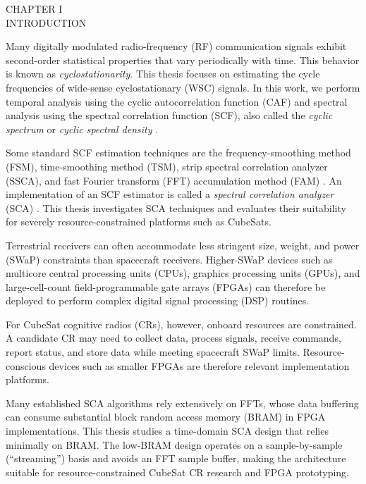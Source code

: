 \newpage
{}

\begin{center}
  \vspace*{1.65in}
  CHAPTER I\\
  INTRODUCTION    
\end{center}
\bigskip

Many digitally modulated radio-frequency (RF) communication signals exhibit second-order statistical properties that vary periodically with time.  This behavior is known as \textit{cyclostationarity}.  This thesis focuses on estimating the cycle frequencies of wide-sense cyclostationary (WSC) signals.  In this work, we perform temporal analysis using the cyclic autocorrelation function (CAF) and spectral analysis using the spectral correlation function (SCF), also called the \textit{cyclic spectrum} or \textit{cyclic spectral density} \cite{spooner-92}.

Some standard SCF estimation techniques are the frequency-smoothing method (FSM), time-smoothing method (TSM), strip spectral correlation analyzer (SSCA), and fast Fourier transform (FFT) accumulation method (FAM) \cite{spooner-92}.  An implementation of an SCF estimator is called a \textit{spectral correlation analyzer} (SCA) \cite{spooner-92,gardner-06}.  This thesis investigates SCA techniques and evaluates their suitability for severely resource-constrained platforms such as CubeSats.

Terrestrial receivers can often accommodate less stringent size, weight, and power (SWaP) constraints than spacecraft receivers.  Higher-SWaP devices such as multicore central processing units (CPUs), graphics processing units (GPUs), and large-cell-count field-programmable gate arrays (FPGAs) can therefore be deployed to perform complex digital signal processing (DSP) routines.

For CubeSat cognitive radios (CRs), however, onboard resources are constrained.  A candidate CR may need to collect data, process signals, receive commands, report status, and store data while meeting spacecraft SWaP limits.  Resource-conscious devices such as smaller FPGAs are therefore relevant implementation platforms.

Many established SCA algorithms rely extensively on FFTs, whose data buffering can consume substantial block random access memory (BRAM) in FPGA implementations.  This thesis studies a time-domain SCA design that relies minimally on BRAM.  The low-BRAM design operates on a sample-by-sample (``streaming'') basis and avoids an FFT sample buffer, making the architecture suitable for resource-constrained CubeSat CR research and FPGA prototyping.

